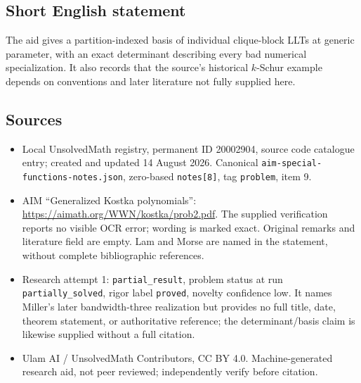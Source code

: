 \documentclass[11pt]{article}
\begin{document}
\subsection{Short English statement}
The aid gives a partition-indexed basis of individual clique-block LLTs at generic parameter, with an exact determinant describing every bad numerical specialization. It also records that the source's historical $k$-Schur example depends on conventions and later literature not fully supplied here.
\subsection{Sources}
\begin{itemize}
\item Local UnsolvedMath registry, permanent ID 20002904, source code catalogue entry; created and updated 14 August 2026. Canonical \texttt{aim-special-functions-notes.json}, zero-based \texttt{notes[8]}, tag \texttt{problem}, item 9.
\item AIM ``Generalized Kostka polynomials'': \url{https://aimath.org/WWN/kostka/prob2.pdf}. The supplied verification reports no visible OCR error; wording is marked exact. Original remarks and literature field are empty. Lam and Morse are named in the statement, without complete bibliographic references.
\item Research attempt 1: \texttt{partial\_result}, problem status at run \texttt{partially\_solved}, rigor label \texttt{proved}, novelty confidence low. It names Miller's later bandwidth-three realization but provides no full title, date, theorem statement, or authoritative reference; the determinant/basis claim is likewise supplied without a full citation.
\item Ulam AI / UnsolvedMath Contributors, CC BY 4.0. Machine-generated research aid, not peer reviewed; independently verify before citation.
\end{itemize}
\end{document}
